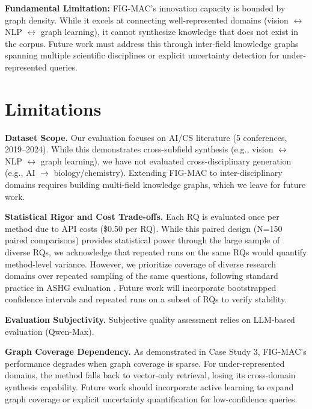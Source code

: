\documentclass[runningheads]{llncs}
\begin{document}
\textbf{Fundamental Limitation:} FIG-MAC's innovation capacity is bounded by graph density. While it excels at connecting well-represented domains (vision $\leftrightarrow$ NLP $\leftrightarrow$ graph learning), it cannot synthesize knowledge that does not exist in the corpus. Future work must address this through inter-field knowledge graphs spanning multiple scientific disciplines or explicit uncertainty detection for under-represented queries.


\section{Limitations}
\label{sec:limitations}

\textbf{Dataset Scope.} Our evaluation focuses on AI/CS literature (5 conferences, 2019--2024). While this demonstrates cross-subfield synthesis (e.g., vision $\leftrightarrow$ NLP $\leftrightarrow$ graph learning), we have not evaluated cross-disciplinary generation (e.g., AI $\rightarrow$ biology/chemistry). Extending FIG-MAC to inter-disciplinary domains requires building multi-field knowledge graphs, which we leave for future work.

\textbf{Statistical Rigor and Cost Trade-offs.} Each RQ is evaluated once per method due to API costs (\$0.50 per RQ). While this paired design (N=150 paired comparisons) provides statistical power through the large sample of diverse RQs, we acknowledge that repeated runs on the same RQs would quantify method-level variance. However, we prioritize coverage of diverse research domains over repeated sampling of the same questions, following standard practice in ASHG evaluation
\cite{DBLP:journals/corr/abs-2408-06292,li2024chain}. Future work will incorporate bootstrapped confidence intervals and repeated runs on a subset of RQs to verify stability.

\textbf{Evaluation Subjectivity.} Subjective quality assessment relies on LLM-based evaluation (Qwen-Max). 

\textbf{Graph Coverage Dependency.} As demonstrated in Case Study 3, FIG-MAC's performance degrades when graph coverage is sparse. For under-represented domains, the method falls back to vector-only retrieval, losing its cross-domain synthesis capability. Future work should incorporate active learning to expand graph coverage or explicit uncertainty quantification for low-confidence queries.
\end{document}
